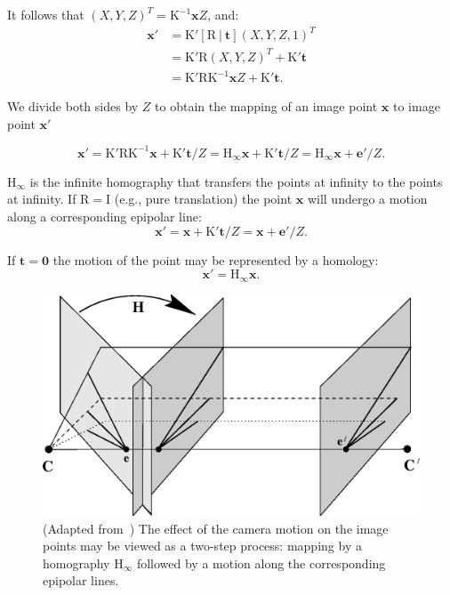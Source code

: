 \documentclass{bmvc2k}
\begin{document}
It follows that $(X,Y,Z)^T = \mathrm{K^{-1}}\mathbf{x}Z$, and:
\begin{align}
  \mathbf{x}' &= \mathrm{K'[R\ |\ \mathbf{t}]}(X,Y,Z,1)^T \\
  &= \mathrm{K'R}(X,Y,Z)^T + \mathrm{K'\mathbf{t}}\\
  &= \mathrm{K'RK^{-1}}\mathbf{x}Z + \mathrm{K'\mathbf{t}}.
\end{align}

We divide both sides by $Z$ to obtain the mapping of an image point $\mathbf{x}$ to image point $\mathbf{x}'$

\begin{equation}
  \label{eq:general_point_motion}
  \mathbf{x}' = \mathrm{K'RK^{-1}}\mathbf{x} + \mathrm{K'}\mathbf{t}/Z = \mathrm{H_\infty}\mathbf{x}+ \mathrm{K'}\mathbf{t}/Z = \mathrm{H_\infty}\mathbf{x} + \mathbf{e'}/Z.
\end{equation}

$\mathrm{H_\infty}$ is the infinite homography that transfers the
points at infinity to the points at infinity.  If $\mathrm{R = I}$
(e.g., pure translation) the point $\mathbf{x}$ will undergo a motion
along a corresponding epipolar line:
\begin{equation}
\mathbf{x}' = \mathbf{x}+ \mathrm{K'}\mathbf{t}/Z = \mathbf{x}+\mathbf{e}'/Z.
\end{equation}

If $\mathbf{t} = \mathbf{0}$ the motion of the point may be represented by a homology:
\begin{equation}
\mathbf{x}' = \mathrm{H_\infty}\mathbf{x}.
\end{equation}

\begin{figure}[h]
  \centering
  \includegraphics[scale=.5]{fig89}
  \caption{(Adapted from~\cite{Hartley2004}) The effect of the camera motion on
    the image points may be viewed as a two-step process: mapping by a
    homography $\mathrm{H_\infty}$ followed by a motion along the corresponding
    epipolar lines.}
  \label{fig:two_step_motion}
\end{figure}
\end{document}
